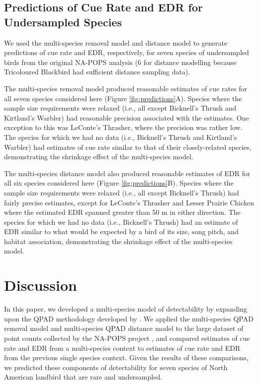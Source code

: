 \documentclass[12pt]{article}
\begin{document}
\subsection{Predictions of Cue Rate and EDR for Undersampled Species}

\par We used the multi-species removal model and distance model to generate predictions of cue rate and EDR, respectively, for seven species of undersampled birds from the original NA-POPS analysis (6 for distance modelling because Tricoloured Blackbird had sufficient distance sampling data).


\par The multi-species removal model produced reasonable estimates of cue rates for all seven species considered here (Figure \ref{fig:predictions}A).
Species where the sample size requirements were relaxed (i.e., all except Bicknell's Thrush and Kirtland's Warbler) had reasonable precision associated with the estimates.
One exception to this was LeConte's Thrasher, where the precision was rather low.
The species for which we had no data (i.e., Bicknell's Thrush and Kirtland's Warbler) had estimates of cue rate similar to that of their closely-related species, demonstrating the shrinkage effect of the multi-species model.

\par The multi-species distance model also produced reasonable estimates of EDR for all six species considered here (Figure \ref{fig:predictions}B).
Species where the sample size requirements were relaxed (i.e., all except Bicknell's Thrush) had fairly precise estimates, except for LeConte's Thrasher and Lesser Prairie Chicken where the estimated EDR spanned greater than 50 m in either direction.
The species for which we had no data (i.e., Bicknell's Thrush) had an estimate of EDR similar to what would be expected by a bird of its size, song pitch, and habitat association, demonstrating the shrinkage effect of the multi-species model.

\section{Discussion}

\par In this paper, we developed a multi-species model of detectability by expanding upon the QPAD methodology developed by \citet{solymos_calibrating_2013}.
We applied the multi-species QPAD removal model and multi-species QPAD distance model to the large dataset of point counts collected by the NA-POPS project \citep{edwards_point_2023}, and compared estimates of cue rate and EDR from a multi-species context to estimates of cue rate and EDR from the previous single species context.
Given the results of these comparisons, we predicted these components of detectability for seven species of North American landbird that are rare and undersampled.
\end{document}
